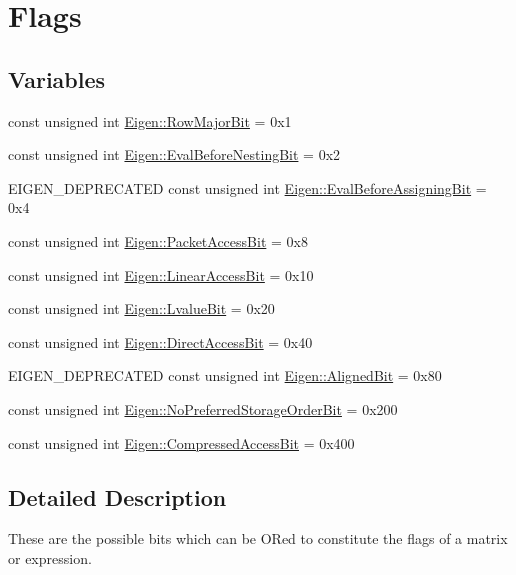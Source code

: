 \hypertarget{group__flags}{}\section{Flags}
\label{group__flags}
\subsection*{Variables}
\begin{DoxyCompactItemize}
\item 
const unsigned int \hyperlink{group__flags_gae4f56c2a60bbe4bd2e44c5b19cbe8762}{Eigen\+::\+Row\+Major\+Bit} = 0x1
\item 
const unsigned int \hyperlink{group__flags_gaa34e83bae46a8eeae4e69ebe3aaecbed}{Eigen\+::\+Eval\+Before\+Nesting\+Bit} = 0x2
\item 
E\+I\+G\+E\+N\+\_\+\+D\+E\+P\+R\+E\+C\+A\+T\+ED const unsigned int \hyperlink{group__flags_ga0972b20dc004d13984e642b3bd12532e}{Eigen\+::\+Eval\+Before\+Assigning\+Bit} = 0x4
\item 
const unsigned int \hyperlink{group__flags_ga1a306a438e1ab074e8be59512e887b9f}{Eigen\+::\+Packet\+Access\+Bit} = 0x8
\item 
const unsigned int \hyperlink{group__flags_ga4b983a15d57cd55806df618ac544d09e}{Eigen\+::\+Linear\+Access\+Bit} = 0x10
\item 
const unsigned int \hyperlink{group__flags_gae2c323957f20dfdc6cb8f44428eaec1a}{Eigen\+::\+Lvalue\+Bit} = 0x20
\item 
const unsigned int \hyperlink{group__flags_gabf1e9d0516a933445a4c307ad8f14915}{Eigen\+::\+Direct\+Access\+Bit} = 0x40
\item 
E\+I\+G\+E\+N\+\_\+\+D\+E\+P\+R\+E\+C\+A\+T\+ED const unsigned int \hyperlink{group__flags_gac5795adacd266512a26890973503ed88}{Eigen\+::\+Aligned\+Bit} = 0x80
\item 
const unsigned int \hyperlink{group__flags_ga3c186ad80ddcf5e2ed3d7ee31cca1860}{Eigen\+::\+No\+Preferred\+Storage\+Order\+Bit} = 0x200
\item 
const unsigned int \hyperlink{group__flags_gaed0244284da47a2b8661261431173caf}{Eigen\+::\+Compressed\+Access\+Bit} = 0x400
\end{DoxyCompactItemize}


\subsection{Detailed Description}
These are the possible bits which can be OR\textquotesingle{}ed to constitute the flags of a matrix or expression.

